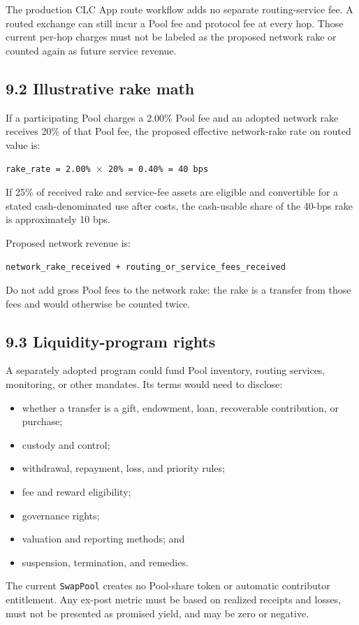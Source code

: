 \documentclass[11pt]{article}
\begin{document}
The production CLC App route workflow adds no separate routing-service fee. A routed exchange can still incur a Pool fee and protocol fee at every hop. Those current per-hop charges must not be labeled as the proposed network rake or counted again as future service revenue.

\subsection*{9.2 Illustrative rake math}

If a participating Pool charges a 2.00\% Pool fee and an adopted network rake receives 20\% of that Pool fee, the proposed effective network-rake rate on routed value is:

\texttt{rake\_rate = 2.00\% $\times$ 20\% = 0.40\% = 40 bps}

If 25\% of received rake and service-fee assets are eligible and convertible for a stated cash-denominated use after costs, the cash-usable share of the 40-bps rake is approximately 10 bps.

Proposed network revenue is:

\texttt{network\_rake\_received + routing\_or\_service\_fees\_received}

Do not add gross Pool fees to the network rake: the rake is a transfer from those fees and would otherwise be counted twice.

\subsection*{9.3 Liquidity-program rights}

A separately adopted program could fund Pool inventory, routing services, monitoring, or other mandates. Its terms would need to disclose:

\begin{itemize}[leftmargin=*]
\item whether a transfer is a gift, endowment, loan, recoverable contribution, or purchase;
\item custody and control;
\item withdrawal, repayment, loss, and priority rules;
\item fee and reward eligibility;
\item governance rights;
\item valuation and reporting methods; and
\item suspension, termination, and remedies.
\end{itemize}
The current \texttt{SwapPool} creates no Pool-share token or automatic contributor entitlement. Any ex-post metric must be based on realized receipts and losses, must not be presented as promised yield, and may be zero or negative.
\end{document}
